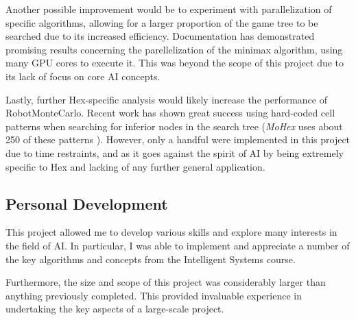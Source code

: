 Another possible improvement would be to experiment with parallelization of specific algorithms, allowing for a larger proportion of the game tree to be searched due to its increased efficiency. Documentation \cite{inproceedings} has demonstrated promising results concerning the parellelization of the minimax algorithm, using many GPU cores to execute it. This was beyond the scope of this project due to its lack of focus on core AI concepts.

Lastly, further Hex-specific analysis would likely increase the performance of RobotMonteCarlo. Recent work \cite{MCTSHex} has shown great success using hard-coded cell patterns when searching for inferior nodes in the search tree (\textit{MoHex} uses about 250 of these patterns \cite{MCTSHex}). However, only a handful were implemented in this project due to time restraints, and as it goes against the spirit of AI by being extremely specific to Hex and lacking of any further general application.

\subsection{Personal Development}

This project allowed me to develop various skills and explore many interests in the field of AI. In particular, I was able to implement and appreciate a number of the key algorithms and concepts from the Intelligent Systems course.

Furthermore, the size and scope of this project was considerably larger than anything previously completed. This provided invaluable experience in undertaking the key aspects of a large-scale project.